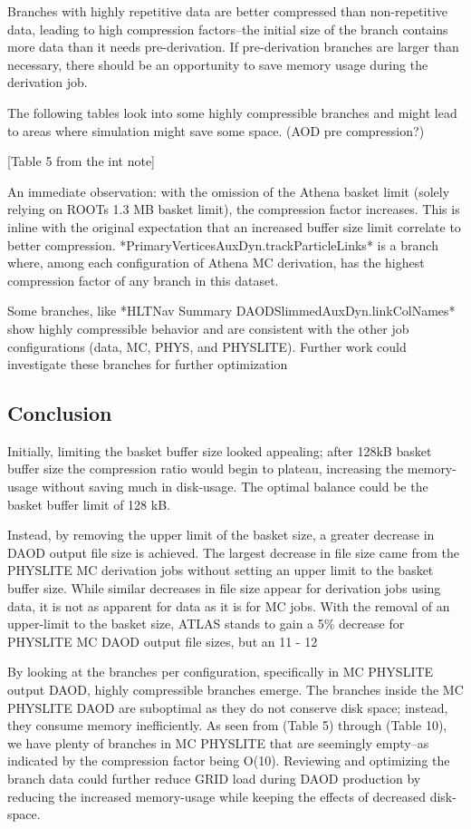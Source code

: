 Branches with highly repetitive data are better compressed than non-repetitive data, leading to high compression factors--the initial size of the branch contains more data than it needs pre-derivation. If pre-derivation branches are larger than necessary, there should be an opportunity to save memory usage during the derivation job. 

The following tables look into some highly compressible branches and might lead to areas where simulation might save some space. (AOD pre compression?)

[Table 5 from the int note]

An immediate observation: with the omission of the Athena basket limit (solely relying on ROOTs 1.3 MB basket limit), the compression factor increases. This is inline with the original expectation that an increased buffer size limit correlate to better compression. *PrimaryVerticesAuxDyn.trackParticleLinks* is a branch where, among each configuration of Athena MC derivation, has the highest compression factor of any branch in this dataset. 

Some branches, like *HLTNav Summary DAODSlimmedAuxDyn.linkColNames* show highly compressible behavior and are consistent with the other job configurations (data, MC, PHYS, and PHYSLITE). Further work could investigate these branches for further optimization 

\subsection{Conclusion}

Initially, limiting the basket buffer size looked appealing; after 128kB basket buffer size the compression ratio would begin to plateau, increasing the memory-usage without saving much in disk-usage. The optimal balance could be the basket buffer limit of 128 kB. 

Instead, by removing the upper limit of the basket size, a greater decrease in DAOD output file size is achieved. The largest decrease in file size came from the PHYSLITE MC derivation jobs without setting an upper limit to the basket buffer size. While similar decreases in file size appear for derivation jobs using data, it is not as apparent for data as it is for MC jobs. With the removal of an upper-limit to the basket size, ATLAS stands to gain a 5\% decrease for PHYSLITE MC DAOD output file sizes, but an 11 - 12%

By looking at the branches per configuration, specifically in MC PHYSLITE output DAOD, highly compressible branches emerge. The branches inside the MC PHYSLITE DAOD are suboptimal as they do not conserve disk space; instead, they consume memory inefficiently. As seen from (Table 5) through (Table 10), we have plenty of branches in MC PHYSLITE that are seemingly empty--as indicated by the compression factor being O(10). Reviewing and optimizing the branch data could further reduce GRID load during DAOD production by reducing the increased memory-usage while keeping the effects of decreased disk-space. 
